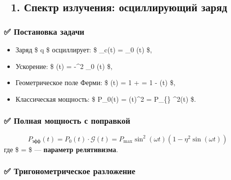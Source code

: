 \documentclass[11pt]{article}
\providecommand{\tightlist}{%
      \setlength{\itemsep}{0pt}\setlength{\parskip}{0pt}}
\begin{document}
\subsection{🔹 1. Спектр излучения: осциллирующий
заряд}\label{ux441ux43fux435ux43aux442ux440-ux438ux437ux43bux443ux447ux435ux43dux438ux44f-ux43eux441ux446ux438ux43bux43bux438ux440ux443ux44eux449ux438ux439-ux437ux430ux440ux44fux434}

\subsubsection{✅ Постановка
задачи}\label{ux43fux43eux441ux442ux430ux43dux43eux432ux43aux430-ux437ux430ux434ux430ux447ux438-3}

\begin{itemize}
\tightlist
\item
  Заряд \$ q \$ осциллирует: \$ \_c(t) = \_0
  \sin(\omega t) \$,
\item
  Ускорение: \$ \vec{\Gamma}(t) = -\omega\^{}2 \_0 \sin(\omega t)
  \$,
\item
  Геометрическое поле Ферми: \$ (t) = 1 +
   = 1 -
   \sin(\omega t) \$,
\item
  Классическая мощность: \$ P\_0(t) = 
  \textbar{}\vec{\Gamma}(t)\textbar{}\^{}2 = P\_\{\}
  \sin\^{}2(\omega t) \$.
\end{itemize}

\subsubsection{✅ Полная мощность с
поправкой}\label{ux43fux43eux43bux43dux430ux44f-ux43cux43eux449ux43dux43eux441ux442ux44c-ux441-ux43fux43eux43fux440ux430ux432ux43aux43eux439}

\[
P_{\text{эфф}}(t) = P_0(t) \cdot \mathcal{G}(t) = P_{\text{max}} \sin^2(\omega t) \left( 1 - \eta^2 \sin(\omega t) \right)
\] где \$ \eta =  \$ --- \textbf{параметр
релятивизма}.

\subsubsection{✅ Тригонометрическое
разложение}\label{ux442ux440ux438ux433ux43eux43dux43eux43cux435ux442ux440ux438ux447ux435ux441ux43aux43eux435-ux440ux430ux437ux43bux43eux436ux435ux43dux438ux435}
\end{document}
